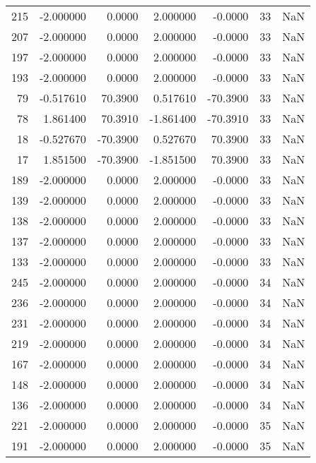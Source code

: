 \begin{tabular}{rrrrrrr}
215 &  -2.000000 &    0.0000 &   2.000000 &     -0.0000 &          33 & NaN \\
207 &  -2.000000 &    0.0000 &   2.000000 &     -0.0000 &          33 & NaN \\
197 &  -2.000000 &    0.0000 &   2.000000 &     -0.0000 &          33 & NaN \\
193 &  -2.000000 &    0.0000 &   2.000000 &     -0.0000 &          33 & NaN \\
 79 &  -0.517610 &   70.3900 &   0.517610 &    -70.3900 &          33 & NaN \\
 78 &   1.861400 &   70.3910 &  -1.861400 &    -70.3910 &          33 & NaN \\
 18 &  -0.527670 &  -70.3900 &   0.527670 &     70.3900 &          33 & NaN \\
 17 &   1.851500 &  -70.3900 &  -1.851500 &     70.3900 &          33 & NaN \\
189 &  -2.000000 &    0.0000 &   2.000000 &     -0.0000 &          33 & NaN \\
139 &  -2.000000 &    0.0000 &   2.000000 &     -0.0000 &          33 & NaN \\
138 &  -2.000000 &    0.0000 &   2.000000 &     -0.0000 &          33 & NaN \\
137 &  -2.000000 &    0.0000 &   2.000000 &     -0.0000 &          33 & NaN \\
133 &  -2.000000 &    0.0000 &   2.000000 &     -0.0000 &          33 & NaN \\
245 &  -2.000000 &    0.0000 &   2.000000 &     -0.0000 &          34 & NaN \\
236 &  -2.000000 &    0.0000 &   2.000000 &     -0.0000 &          34 & NaN \\
231 &  -2.000000 &    0.0000 &   2.000000 &     -0.0000 &          34 & NaN \\
219 &  -2.000000 &    0.0000 &   2.000000 &     -0.0000 &          34 & NaN \\
167 &  -2.000000 &    0.0000 &   2.000000 &     -0.0000 &          34 & NaN \\
148 &  -2.000000 &    0.0000 &   2.000000 &     -0.0000 &          34 & NaN \\
136 &  -2.000000 &    0.0000 &   2.000000 &     -0.0000 &          34 & NaN \\
221 &  -2.000000 &    0.0000 &   2.000000 &     -0.0000 &          35 & NaN \\
191 &  -2.000000 &    0.0000 &   2.000000 &     -0.0000 &          35 & NaN \\

\end{tabular}
